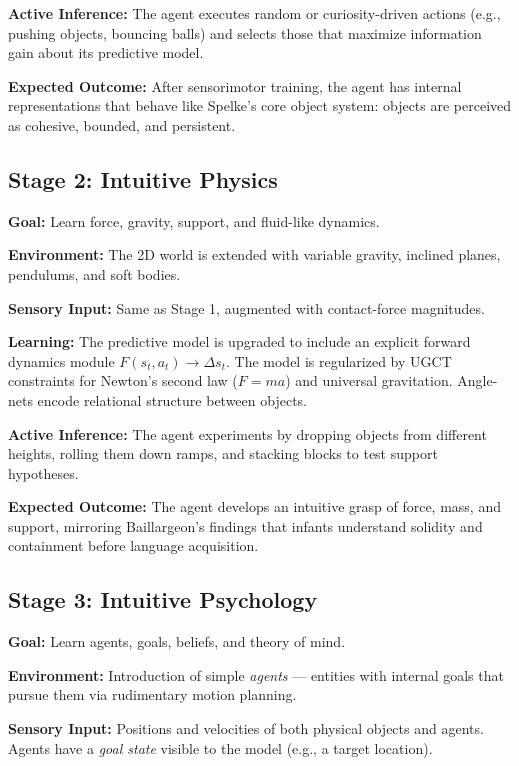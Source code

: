 \documentclass[11pt,oneside]{article}
\begin{document}
\textbf{Active Inference:} The agent executes random or curiosity-driven actions (e.g., pushing objects, bouncing balls) and selects those that maximize information gain about its predictive model.

\textbf{Expected Outcome:} After sensorimotor training, the agent has internal representations that behave like Spelke's core object system: objects are perceived as cohesive, bounded, and persistent.

\subsection{Stage 2: Intuitive Physics}

\textbf{Goal:} Learn force, gravity, support, and fluid-like dynamics.

\textbf{Environment:} The 2D world is extended with variable gravity, inclined planes, pendulums, and soft bodies.

\textbf{Sensory Input:} Same as Stage 1, augmented with contact-force magnitudes.

\textbf{Learning:} The predictive model is upgraded to include an explicit forward dynamics module $F(s_t, a_t) \rightarrow \Delta s_t$. The model is regularized by UGCT constraints for Newton's second law ($F=ma$) and universal gravitation. Angle-nets encode relational structure between objects.

\textbf{Active Inference:} The agent experiments by dropping objects from different heights, rolling them down ramps, and stacking blocks to test support hypotheses.

\textbf{Expected Outcome:} The agent develops an intuitive grasp of force, mass, and support, mirroring Baillargeon's findings that infants understand solidity and containment before language acquisition.

\subsection{Stage 3: Intuitive Psychology}

\textbf{Goal:} Learn agents, goals, beliefs, and theory of mind.

\textbf{Environment:} Introduction of simple \emph{agents} — entities with internal goals that pursue them via rudimentary motion planning.

\textbf{Sensory Input:} Positions and velocities of both physical objects and agents. Agents have a \emph{goal state} visible to the model (e.g., a target location).
\end{document}

